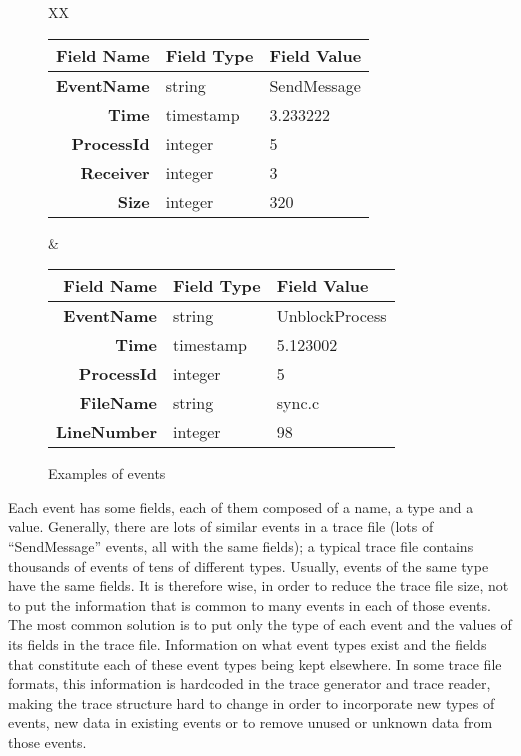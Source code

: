\documentclass[12pt]{article}
\begin{document}
\begin{figure}[!htb]
\begin{tabularx}{\textwidth}{XX}
\begin{tabular}{|>{\bf}rll|}
\hline
\textbf{Field Name} & \textbf{Field Type} & \textbf{Field Value} \\\hline
EventName     & string    & SendMessage \\
Time          & timestamp & 3.233222    \\
ProcessId     & integer   & 5           \\
Receiver      & integer   & 3           \\
Size          & integer   & 320         \\
\hline
\end{tabular}
&
\begin{tabular}{|>{\bf}rll|}
\hline
\textbf{Field Name} & \textbf{Field Type} & \textbf{Field Value} \\\hline
EventName     & string    & UnblockProcess \\
Time          & timestamp & 5.123002    \\
ProcessId     & integer   & 5           \\
FileName      & string    & sync.c      \\
LineNumber    & integer   & 98          \\
\hline
\end{tabular}
\end{tabularx}
\caption{Examples of events}
\label{f:event:table}
\end{figure}

Each event has some fields, each of them composed of a name, a type
and a value. Generally, there are lots of similar events in a trace
file (lots of ``SendMessage'' events, all with the same fields); a
typical trace file contains thousands of events of tens of different
types.  Usually, events of the same type have the same fields.  It is
therefore wise, in order to reduce the trace file size, not to put the
information that is common to many events in each of those events.
The most common solution is to put only the type of each event and the
values of its fields in the trace file. Information on what event
types exist and the fields that constitute each of these event types
being kept elsewhere.  In some trace file formats, this information is
hardcoded in the trace generator and trace reader, making the trace
structure hard to change in order to incorporate new types of events,
new data in existing events or to remove unused or unknown data from
those events.
\end{document}

